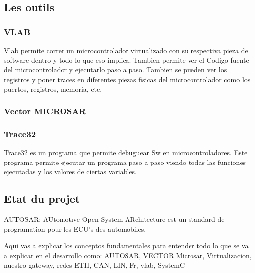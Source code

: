 \subsection{Les outils}
\subsubsection{VLAB}
Vlab permite correr un microcontrolador virtualizado con su respectiva pieza de software dentro y todo lo que eso implica. Tambien permite ver el Codigo fuente del microcontrolador y ejecutarlo paso a paso. Tambien se pueden ver los registros y poner traces en diferentes piezas fisicas del microcontrolador como los puertos, registros, memoria, etc.
\subsubsection{Vector MICROSAR}

\subsubsection{Trace32}
Trace32 es un programa que permite debuguear Sw en microcontroladores. Este programa permite ejecutar un programa paso a paso viendo todas las funciones ejecutadas y los valores de ciertas variables.  

\subsection{Etat du projet}
AUTOSAR: AUtomotive Open System ARchitecture est un standard de programation pour les ECU's des automobiles.


Aqui vas a explicar los conceptos fundamentales para entender todo lo que se va a explicar en el desarrollo como: AUTOSAR, VECTOR Microsar, Virtualizacion, nuestro gateway, redes ETH, CAN, LIN, Fr, vlab, SystemC